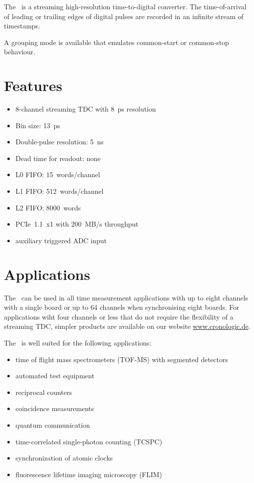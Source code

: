 The \deviceName\ is a streaming high-resolution time-to-digital converter. 
The time-of-arrival of leading or trailing edges of digital pulses are recorded in an infinite stream of timestamps.

A grouping mode is available that emulates common-start or common-stop behaviour. 

\section{Features}
	\begin{itemize}
		\item 8-channel streaming TDC with 8~ps resolution
		\item Bin size: 13~ps
		\item Double-pulse resolution: 5~ns
		\item Dead time for readout: none
		\item L0 FIFO: 15~words/channel
		\item L1 FIFO: 512~words/channel
		\item L2 FIFO: 8000~words
		\item PCIe~1.1~x1 with 200~MB/s throughput
		\item auxiliary triggered ADC input
	\end{itemize} 
\section{Applications}
The \deviceName\ can be used in all time measurement applications with up to eight channels with a single board or up to 64 channels when synchronising eight boards. For applications wiht four channels or less that do not require the flexibility of a streaming TDC, simpler products are available on our website \href{https://www.cronologic.de/products/products-overview#tdcdata}{www.cronologic.de}.

The \deviceName\ is well suited for the following applications:
\begin{itemize}
	\item time of flight mass spectrometers (TOF-MS) with segmented detectors
	\item automated test equipment
	\item reciprocal counters
	\item coincidence measurements
	\item quantum communication
	\item time-correlated single-photon counting (TCSPC)
	\item synchronization of atomic clocks
	\item fluorescence lifetime imaging microscopy (FLIM)
\end{itemize} 